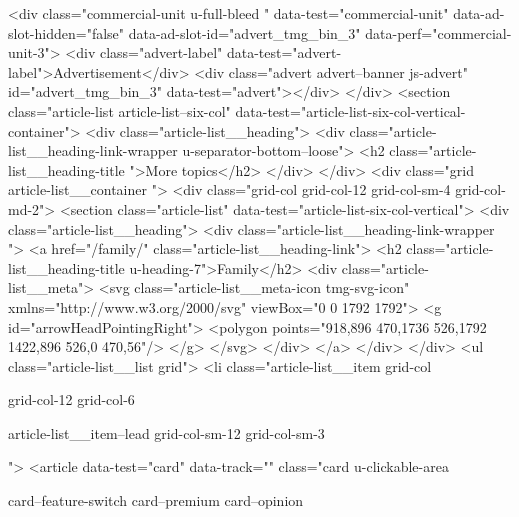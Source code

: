 {{{		
			
				
			
	
<div class="commercial-unit u-full-bleed " data-test="commercial-unit" data-ad-slot-hidden="false" data-ad-slot-id="advert_tmg_bin_3" data-perf="commercial-unit-3">
<div class="advert-label" data-test="advert-label">Advertisement</div>
<div class="advert advert--banner js-advert" id="advert_tmg_bin_3" data-test="advert"></div>
</div>
<section class="article-list article-list--six-col" data-test="article-list-six-col-vertical-container">
<div class="article-list__heading">
<div class="article-list__heading-link-wrapper
				u-separator-bottom--loose">
<h2 class="article-list__heading-title ">More topics</h2>
</div>
</div>
<div class="grid article-list__container ">
<div class="grid-col grid-col-12 grid-col-sm-4 grid-col-md-2">
<section class="article-list" data-test="article-list-six-col-vertical">
<div class="article-list__heading">
<div class="article-list__heading-link-wrapper
				">
<a href="/family/" class="article-list__heading-link">
<h2 class="article-list__heading-title u-heading-7">Family</h2>
<div class="article-list__meta">
<svg class="article-list__meta-icon  tmg-svg-icon" xmlns="http://www.w3.org/2000/svg" viewBox="0 0 1792 1792">
<g id="arrowHeadPointingRight">
<polygon points="918,896 470,1736 526,1792 1422,896 526,0 470,56"/>
</g>
</svg>
</div>
</a>
</div>
</div>
<ul class="article-list__list grid">
<li class="article-list__item
				grid-col
				
				
				
				grid-col-12
				grid-col-6
				
				
				
				
				article-list__item--lead grid-col-sm-12
				grid-col-sm-3
				
				
				">
<article data-test="card" data-track="" class="card
			u-clickable-area
			
			card--feature-switch
			card--premium
			card--opinion
			
			
			
}}}
